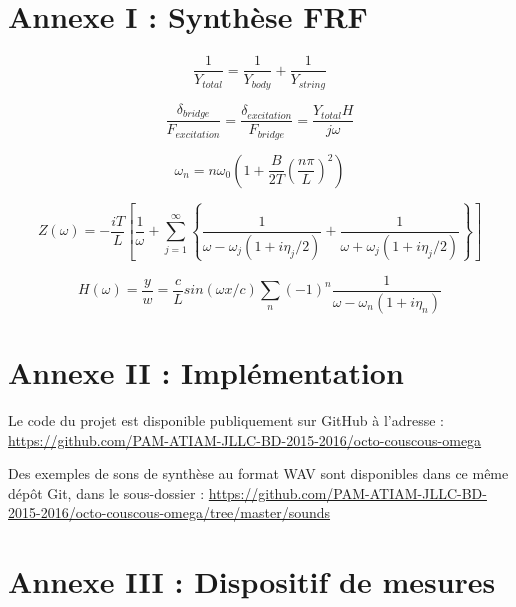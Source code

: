 \newpage
\section*{Annexe I : Synthèse FRF}

\begin{equation}
  \frac{1}{Y_{total}} = \frac{1}{Y_{body}} + \frac{1}{Y_{string}}
  \label{eq:eq_frf_1}
\end{equation}

\begin{equation}
  \frac{\delta_{bridge}}{F_{excitation}} = \frac{\delta_{excitation}}{F_{bridge}} = \frac{Y_{total}H}{j\omega}
  \label{eq:eq_frf_2}
\end{equation}

\begin{equation}
	\omega_n = n\omega_0\left(1+\frac{B}{2T}(\frac{n\pi}{L})^2\right)
 \label{eq:eq_frf_3}
\end{equation}


\begin{equation}
 Z(\omega) = -\frac{iT}{L} \left[ \frac{1}{\omega} + \sum_{j=1}^{\infty} \left\lbrace \frac{1}{\omega - \omega_j (1+ i\eta_j/2)} + \frac{1}{\omega + \omega_j (1+ i\eta_j/2)} \right\rbrace  \right]
  \label{eq:eq_frf_4}
\end{equation}

\begin{equation}
H(\omega) = \frac{y}{w} = \frac{c}{L} sin(\omega x/c )\sum_n (-1)^n \frac{1}{\omega - \omega_n(1 + i\eta_n)}
  \label{eq:eq_frf_5}
\end{equation}

\section*{Annexe II : Implémentation}

Le code du projet est disponible publiquement sur GitHub à l'adresse :
\url{https://github.com/PAM-ATIAM-JLLC-BD-2015-2016/octo-couscous-omega}

Des exemples de sons de synthèse au format WAV sont disponibles dans ce même dépôt Git,
dans le sous-dossier :
\url{https://github.com/PAM-ATIAM-JLLC-BD-2015-2016/octo-couscous-omega/tree/master/sounds}


\section*{Annexe III : Dispositif de mesures}

